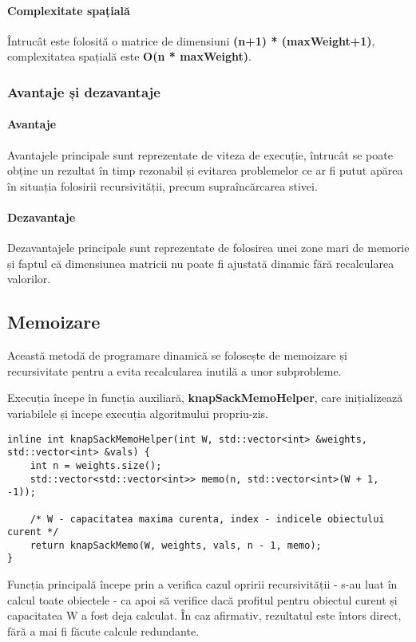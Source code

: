 \documentclass[runningheads]{llncs}
\begin{document}
\paragraph{Complexitate spațială} Întrucât este folosită o matrice de dimensiuni \textbf{(n+1) * (maxWeight+1)},
complexitatea spațială este \textbf{O(n * maxWeight)}.

\subsubsection{Avantaje și dezavantaje}

\paragraph{Avantaje} Avantajele principale sunt reprezentate de viteza de execuție, întrucât se poate
obține un rezultat în timp rezonabil și evitarea problemelor ce ar fi putut apărea în situația
folosirii recursivității, precum supraîncărcarea stivei.

\paragraph{Dezavantaje} Dezavantajele principale sunt reprezentate de folosirea unei zone mari de
memorie și faptul că dimensiunea matricii nu poate fi ajustată dinamic fără recalcularea valorilor.


\subsection{Memoizare}
Această metodă de programare dinamică se folosește de memoizare și recursivitate pentru
a evita recalcularea inutilă a unor subprobleme.

Execuția începe în funcția auxiliară, \textbf{knapSackMemoHelper}, care inițializează variabilele
și începe execuția algoritmului propriu-zis.

\begin{lstlisting}
inline int knapSackMemoHelper(int W, std::vector<int> &weights, std::vector<int> &vals) {
	int n = weights.size();
	std::vector<std::vector<int>> memo(n, std::vector<int>(W + 1, -1));

	/* W - capacitatea maxima curenta, index - indicele obiectului curent */
	return knapSackMemo(W, weights, vals, n - 1, memo);
}
\end{lstlisting}

Funcția principală începe prin a verifica cazul opririi recursivității - s-au
luat în calcul toate obiectele - ca apoi să verifice dacă profitul pentru obiectul
curent și capacitatea W a fost deja calculat. În caz afirmativ, rezultatul este întors
direct, fără a mai fi făcute calcule redundante.
\end{document}
